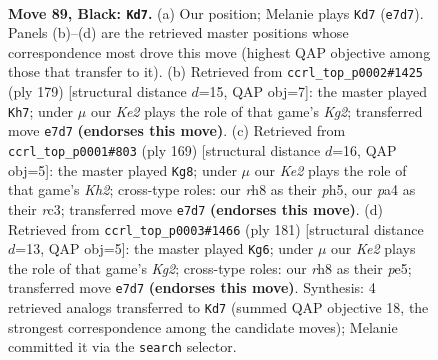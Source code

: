 \documentclass[11pt]{article}
\begin{document}
\clearpage

\begin{figure}[p]\centering
\begin{subfigure}{0.46\textwidth}\centering
\resizebox{\linewidth}{!}{%
\newchessgame
\chessboard[
  setfen={7R/4k3/4pp2/8/P3P3/5PK1/1R6/2r5 b - - 5 89},
  showmover=false,
  pgfstyle=straightmove, color=movearrow, markmove={e7-d7}
]}
\caption{}
\end{subfigure}\hfill
\begin{subfigure}{0.46\textwidth}\centering
\resizebox{\linewidth}{!}{%
\newchessgame
\chessboard[
  setfen={8/5pk1/7p/7P/6P1/5PK1/3R4/1r6 b - - 76 90},
  showmover=false,
  pgfstyle=straightmove, color=movearrow, markmove={g7-h7}
]}
\caption{}
\end{subfigure}
\\[4pt]
\begin{subfigure}{0.46\textwidth}\centering
\resizebox{\linewidth}{!}{%
\newchessgame
\chessboard[
  setfen={8/5p1k/5P1p/4P2P/5K2/2R5/8/3r4 b - - 57 85},
  showmover=false,
  pgfstyle=straightmove, color=movearrow, markmove={h7-g8}
]}
\caption{}
\end{subfigure}\hfill
\begin{subfigure}{0.46\textwidth}\centering
\resizebox{\linewidth}{!}{%
\newchessgame
\chessboard[
  setfen={8/5pk1/4p3/4P3/3R1PPK/1r6/8/8 b - - 98 91},
  showmover=false,
  pgfstyle=straightmove, color=movearrow, markmove={g7-g6}
]}
\caption{}
\end{subfigure}
\caption{\textbf{Move 89, Black: \texttt{Kd7}.} (a) Our position; Melanie plays \texttt{Kd7} (\texttt{e7d7}). Panels (b)--(d) are the retrieved master positions whose correspondence most drove this move (highest QAP objective among those that transfer to it). (b) Retrieved from \texttt{ccrl\_top\_p0002\#1425} (ply 179) [structural distance $d$=15, QAP obj=7]: the master played \texttt{Kh7}; under $\mu$ our \emph{Ke2} plays the role of that game's \emph{Kg2}; transferred move \texttt{e7d7} \textbf{(endorses this move)}. (c) Retrieved from \texttt{ccrl\_top\_p0001\#803} (ply 169) [structural distance $d$=16, QAP obj=5]: the master played \texttt{Kg8}; under $\mu$ our \emph{Ke2} plays the role of that game's \emph{Kh2}; cross-type roles: our \emph{r}h8 as their \emph{p}h5, our \emph{p}a4 as their \emph{r}c3; transferred move \texttt{e7d7} \textbf{(endorses this move)}. (d) Retrieved from \texttt{ccrl\_top\_p0003\#1466} (ply 181) [structural distance $d$=13, QAP obj=5]: the master played \texttt{Kg6}; under $\mu$ our \emph{Ke2} plays the role of that game's \emph{Kg2}; cross-type roles: our \emph{r}h8 as their \emph{p}e5; transferred move \texttt{e7d7} \textbf{(endorses this move)}. Synthesis: 4 retrieved analogs transferred to \texttt{Kd7} (summed QAP objective 18, the strongest correspondence among the candidate moves); Melanie committed it via the \texttt{search} selector.}
\label{fig:thought-m177}
\end{figure}
\end{document}

